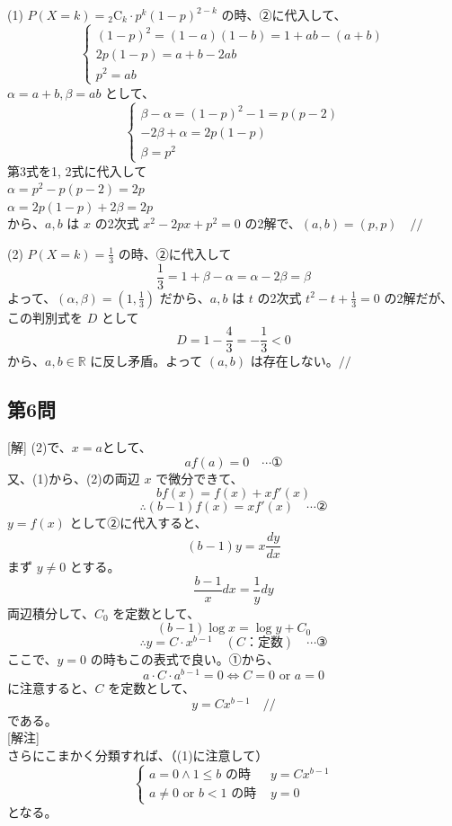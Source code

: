\documentclass[../main.tex]{subfiles}
\begin{document}
(1) $P(X=k) = {}_2\mathrm{C}_k \cdot p^k (1-p)^{2-k}$ の時、②に代入して、
\[
\begin{cases}
(1-p)^2 = (1-a)(1-b) = 1 + ab - (a+b) \\
2p(1-p) = a + b - 2ab \\
p^2 = ab
\end{cases}
\]
$\alpha = a+b, \beta = ab$ として、
\[
\begin{cases}
\beta - \alpha = (1-p)^2 - 1 = p(p-2) \\
-2\beta + \alpha = 2p(1-p) \\
\beta = p^2
\end{cases}
\]
第3式を1, 2式に代入して\\
$\alpha = p^2 - p(p-2) = 2p$\\
$\alpha = 2p(1-p) + 2\beta = 2p$\\
から、$a, b$ は $x$ の2次式 $x^2 - 2px + p^2 = 0$ の2解で、$(a, b) = (p, p) \quad \text{//} $

(2) $P(X=k) = \frac{1}{3}$ の時、②に代入して
\[ \frac{1}{3} = 1 + \beta - \alpha = \alpha - 2\beta = \beta \]
よって、$(\alpha, \beta) = \left(1, \frac{1}{3}\right)$ だから、$a, b$ は $t$ の2次式 $t^2 - t + \frac{1}{3} = 0$ の2解だが、この判別式を $D$ として
\[ D = 1 - \frac{4}{3} = -\frac{1}{3} < 0 \]
から、$a, b \in \mathbb{R}$ に反し矛盾。よって $(a, b)$ は存在しない。$\text{//} $

\subsection*{第6問}
[解] (2)で、$x=a$として、
\[ a f(a) = 0 \quad \cdots \text{①} \]
又、(1)から、(2)の両辺 $x$ で微分できて、
\[ b f(x) = f(x) + x f'(x) \]
\[ \therefore (b-1) f(x) = x f'(x) \quad \cdots \text{②} \]
$y = f(x)$ として②に代入すると、
\[ (b-1) y = x \frac{dy}{dx} \]
まず $y \neq 0$ とする。
\[ \frac{b-1}{x} dx = \frac{1}{y} dy \]
両辺積分して、$C_0$ を定数として、
\[ (b-1) \log x = \log y + C_0 \]
\[ \therefore y = C \cdot x^{b-1} \quad (C\text{：定数}) \quad \cdots \text{③} \]
ここで、$y=0$ の時もこの表式で良い。①から、
\[ a \cdot C \cdot a^{b-1} = 0 \iff C = 0 \text{ or } a = 0 \]
に注意すると、$C$ を定数として、
\[ y = C x^{b-1} \quad \text{//} \]
である。\\
{[解注]}\\
さらにこまかく分類すれば、（(1)に注意して）
\[
\begin{cases}
a=0 \wedge 1 \le b \text{ の時 } & y = C x^{b-1} \\
a \neq 0 \text{ or } b < 1 \text{ の時 } & y = 0
\end{cases}
\]
となる。
\end{document}

